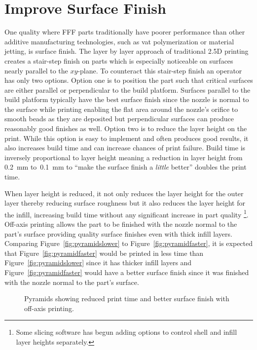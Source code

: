 \documentclass[main.tex]{subfiles}
\begin{document}
\section{Improve Surface Finish}
One quality where FFF parts traditionally have poorer performance than other additive manufacturing technologies, such as vat polymerization or material jetting, is surface finish.
The layer by layer approach of traditional 2.5D printing creates a stair-step finish on parts which is especially noticeable on surfaces nearly parallel to the $xy$\nobreakdash-plane.
To counteract this stair-step finish an operator has only two options.
Option one is to position the part such that critical surfaces are either parallel or perpendicular to the build platform.
Surfaces parallel to the build platform typically have the best surface finish since the nozzle is normal to the surface while printing enabling the flat area around the nozzle's orifice to smooth beads as they are deposited but perpendicular surfaces can produce reasonably good finishes as well.
Option two is to reduce the layer height on the print.
While this option is easy to implement and often produces good results, it also increases build time and can increase chances of print failure.
Build time is inversely proportional to layer height meaning a reduction in layer height from \SI{0.2}{mm} to~\SI{0.1}{mm} to ``make the surface finish a \emph{little} better'' doubles the print time.

When layer height is reduced, it not only reduces the layer height for the outer layer thereby reducing surface roughness but it also reduces the layer height for the infill, increasing build time without any significant increase in part quality%
\footnote{Some slicing software has begun adding options to control shell and infill layer heights separately.}.
Off-axis printing allows the part to be finished with the nozzle normal to the part's surface providing quality surface finishes even with thick infill layers.
Comparing Figure~\ref{fig:pyramidslower} to Figure~\ref{fig:pyramidfaster}, it is expected that Figure~\ref{fig:pyramidfaster} would be printed in less time than Figure~\ref{fig:pyramidslower} since it has thicker infill layers and Figure~\ref{fig:pyramidfaster} would have a better surface finish since it was finished with the nozzle normal to the part's surface.

\begin{figure}[]
\linethickness{1.2pt}
\center
	\quad
	\caption{Pyramids showing reduced print time and better surface finish with off-axis printing.}
	\label{fig:pyramid}
\end{figure}
\end{document}
